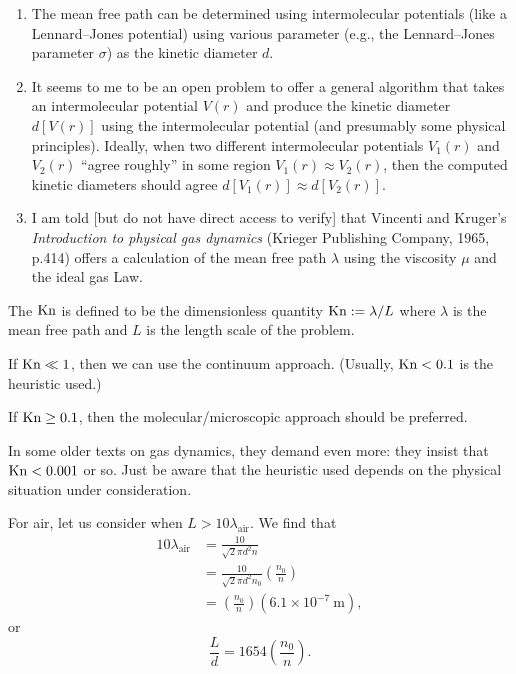 \begin{aside}
\begin{enumerate}
\item The mean free path can be determined using intermolecular potentials
(like a Lennard--Jones potential) using various parameter (e.g., the
Lennard--Jones parameter $\sigma$) as the kinetic diameter $d$. 
\item It seems to me to be an open problem to offer a general algorithm that
takes an intermolecular potential $V(r)$ and produce the kinetic
diameter $d[V(r)]$ using the intermolecular potential (and presumably
some physical principles). Ideally, when two different intermolecular
potentials $V_{1}(r)$ and $V_{2}(r)$ ``agree roughly'' in some region
$V_{1}(r)\approx V_{2}(r)$, then the computed kinetic diameters should
agree $d[V_{1}(r)]\approx d[V_{2}(r)]$.
\item I am told [but do not have direct access to verify] that
Vincenti and Kruger's \textit{Introduction to physical gas dynamics}
(Krieger Publishing Company, 1965, p.414) offers a calculation of the
mean free path $\lambda$ using the viscosity $\mu$ and the ideal gas Law.
\end{enumerate}
\end{aside}

\begin{definition}
The  $\mathrm{Kn}$ is defined to be the dimensionless
quantity $\mathrm{Kn} := \lambda/L$ where $\lambda$ is the mean free path and
$L$ is the length scale of the problem.
\end{definition}

\begin{node}
If $\mathrm{Kn}\ll1$, then we can use the continuum approach. (Usually,
$\mathrm{Kn}<0.1$ is the heuristic used.)

If $\mathrm{Kn}\geq0.1$, then the molecular/microscopic approach should be preferred.
\end{node}

\begin{remark}
In some older texts on gas dynamics, they demand even more: they
insist that $\mathrm{Kn}<0.001$ or so. Just be aware that the heuristic used
depends on the physical situation under consideration.
\end{remark}

\begin{example}
For air, let us consider when $L>10\lambda_{\text{air}}$. We
find that
\begin{subequations}
  \begin{align}
10\lambda_{\text{air}} &= \frac{10}{\sqrt{2}\pi d^{2}n}\\
&=\frac{10}{\sqrt{2}\pi d^{2}n_{0}}\left(\frac{n_{0}}{n}\right)\\
&=\left(\frac{n_{0}}{n}\right)(6.1\times10^{-7}~\mathrm{m}),
  \end{align}
\end{subequations}
or
\begin{equation}
\frac{L}{d}=1654\left(\frac{n_{0}}{n}\right).
\end{equation}
\end{example}

